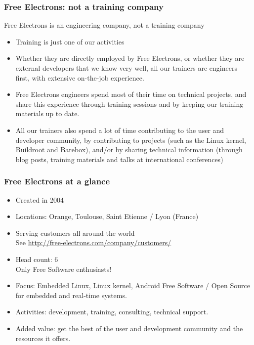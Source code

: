\begin{frame}
\frametitle{Free Electrons: not a training company}
  Free Electrons is an engineering company, not a training company
  \begin{itemize}
    \item Training is just one of our activities
    \item Whether they are directly employed by Free Electrons, or whether
          they are external developers that we know very well, all 
          our trainers are engineers first, with extensive on-the-job
          experience.
    \item Free Electrons engineers spend most of their time on technical projects,
          and share this experience through training sessions and by
          keeping our training materials up to date.
    \item All our trainers also spend a lot of time contributing to the user
          and developer community, by contributing to projects (such as the Linux kernel,
          Buildroot and Barebox), and/or by sharing technical information (through
          blog posts, training materials and talks at international
          conferences)
  \end{itemize}
\end{frame}

\begin{frame}
\frametitle{Free Electrons at a glance}
  \begin{itemize}
    \item Created in 2004
    \item Locations: Orange, Toulouse, Saint Etienne / Lyon (France)
    \item Serving customers all around the world \\
          See \url{http://free-electrons.com/company/customers/}
    \item Head count: 6 \\
	  Only Free Software enthusiasts!
    \item Focus: Embedded Linux, Linux kernel, Android
          Free Software / Open Source
          for embedded and real-time systems.
    \item Activities: development, training, consulting, technical
          support.
    \item Added value: get the best of the user and development
          community and the resources it offers.
  \end{itemize}
\end{frame}

